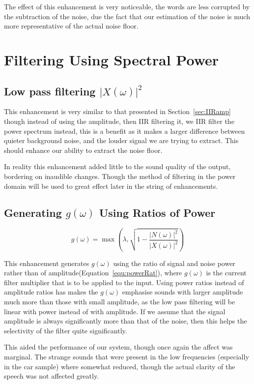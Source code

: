\documentclass[11pt]{article} %
\begin{document}
{The effect of this enhancement is very noticeable, the words are less corrupted by the subtraction of the noise, due the fact that our estimation of the noise is much more representative of the actual noise floor.   
\section{Filtering Using Spectral Power} 
\subsection{Low pass filtering $\lvert X(\omega) \rvert^{2} $} 

This enhancement is very similar to that presented in Section~\ref{sec:IIRamp} though instead of using the amplitude, then IIR filtering it, we IIR filter the power spectrum instead, this is a benefit as it makes a larger difference between quieter background noise, and the louder signal we are trying to extract. This should enhance our ability to extract the noise floor. 

In reality this enhancement added little to the sound quality of the output, bordering on inaudible changes. Though the method of filtering in the power domain will be used to great effect later in the string of enhancements.  

\subsection{Generating $g(\omega)$ Using Ratios of Power} 
\label{sec:powerrat}
\begin{equation}
\label{equ:powerRat}
	g(\omega) = \max\left(\lambda, \sqrt{1- \frac{\lvert N(\omega) \rvert ^{2}}{\lvert X(\omega) \rvert ^{2}}}\right)
\end{equation}

This enhancement generates $g(\omega)$ using the ratio of signal and noise power rather than of amplitude(Equation~\ref{equ:powerRat}), where $g(\omega)$ is the current filter multiplier that is to be applied to the input. Using power ratios instead of amplitude ratios has makes the $g(\omega)$ emphasise sounds with larger amplitude much more than those with small amplitude, as the low pass filtering will be linear with power instead of with amplitude. If we assume that the signal amplitude is always significantly more than that of the noise, then this helps the selectivity of the filter quite significantly.

This aided the performance of our system, though once again the affect was marginal. The strange sounds that were present in the low frequencies (especially in the car sample) where somewhat reduced, though the actual clarity of the speech was not affected greatly.

}
\end{document}

